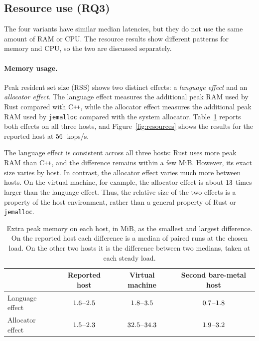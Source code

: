 \documentclass[english,oneside,a4paper,censored,csm,software-track-2020]{HYthesisML}
\begin{document}
\FloatBarrier
\subsection{Resource use (RQ3)}\label{sec:resources}
The four variants have similar median latencies, but they do not use the same
amount of RAM or CPU. The resource results show different patterns for
memory and CPU, so the two are discussed separately.

\paragraph{Memory usage.}
Peak resident set size (RSS) shows two distinct effects: a
\emph{language effect} and an \emph{allocator effect}. The language effect
measures the additional peak RAM used by Rust compared with C\texttt{++},
while the allocator effect measures the additional peak RAM used by
\texttt{jemalloc} compared with the system allocator. Table~\ref{tab:rsshosts}
reports both effects on all three hosts, and Figure~\ref{fig:resources}
shows the results for the reported host at $56$~kops/s.

The language effect is consistent across all three hosts: Rust uses more
peak RAM than C\texttt{++}, and the difference remains within a few MiB.
However, its exact size varies by host. In contrast, the allocator effect
varies much more between hosts. On the virtual machine, for example, the
allocator effect is about $13$ times larger than the
language effect. Thus, the relative size of the two effects is a property
of the host environment, rather than a general property of Rust or
\texttt{jemalloc}.

\enlargethispage{24pt}
\begin{table}[!ht]
\centering
\small
\caption[Extra peak memory on each host]{Extra peak memory on each host, in MiB, as the smallest and largest difference. On the reported host each difference is a median of paired runs at the chosen load. On the other two hosts it is the difference between two medians, taken at each steady load.\label{tab:rsshosts}}
\renewcommand{\arraystretch}{1.2}
\begin{tabular}{@{}lccc@{}}
\hline\hline
 & Reported host & Virtual machine & Second bare-metal host \\
\hline
Language effect & $1.6$--$2.5$
  & $1.8$--$3.5$ & $0.7$--$1.8$ \\
Allocator effect & $1.5$--$2.3$
  & $32.5$--$34.3$ & $1.9$--$3.2$ \\
\hline
\end{tabular}
\end{table}
\end{document}
